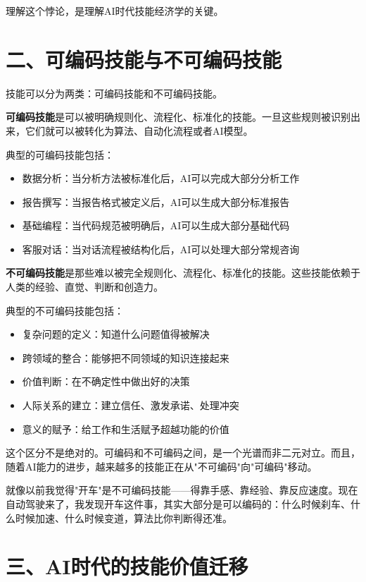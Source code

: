 理解这个悖论，是理解AI时代技能经济学的关键。

\section{二、可编码技能与不可编码技能}


技能可以分为两类：可编码技能和不可编码技能。

\textbf{可编码技能}是可以被明确规则化、流程化、标准化的技能。一旦这些规则被识别出来，它们就可以被转化为算法、自动化流程或者AI模型。

典型的可编码技能包括：

\begin{itemize}
\item 数据分析：当分析方法被标准化后，AI可以完成大部分分析工作
\item 报告撰写：当报告格式被定义后，AI可以生成大部分标准报告
\item 基础编程：当代码规范被明确后，AI可以生成大部分基础代码
\item 客服对话：当对话流程被结构化后，AI可以处理大部分常规咨询

\end{itemize}
\textbf{不可编码技能}是那些难以被完全规则化、流程化、标准化的技能。这些技能依赖于人类的经验、直觉、判断和创造力。

典型的不可编码技能包括：

\begin{itemize}
\item 复杂问题的定义：知道什么问题值得被解决
\item 跨领域的整合：能够把不同领域的知识连接起来
\item 价值判断：在不确定性中做出好的决策
\item 人际关系的建立：建立信任、激发承诺、处理冲突
\item 意义的赋予：给工作和生活赋予超越功能的价值

\end{itemize}
这个区分不是绝对的。可编码和不可编码之间，是一个光谱而非二元对立。而且，随着AI能力的进步，越来越多的技能正在从"不可编码"向"可编码"移动。

就像以前我觉得"开车"是不可编码技能——得靠手感、靠经验、靠反应速度。现在自动驾驶来了，我发现开车这件事，其实大部分是可以编码的：什么时候刹车、什么时候加速、什么时候变道，算法比你判断得还准。

\section{三、AI时代的技能价值迁移}


